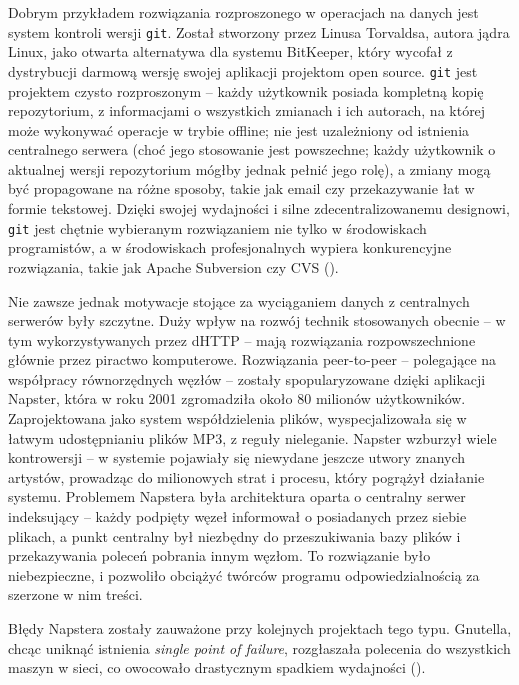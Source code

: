 Dobrym przykładem rozwiązania rozproszonego w operacjach na danych jest system kontroli wersji \texttt{git}.
Został stworzony przez Linusa Torvaldsa, autora jądra Linux, jako otwarta alternatywa dla systemu BitKeeper, który wycofał z dystrybucji darmową wersję swojej aplikacji projektom open source.
\texttt{git} jest projektem czysto rozproszonym -- każdy użytkownik posiada kompletną kopię repozytorium, z informacjami o wszystkich zmianach i ich autorach, na której może wykonywać operacje w trybie offline; nie jest uzależniony od istnienia centralnego serwera (choć jego stosowanie jest powszechne; każdy użytkownik o aktualnej wersji repozytorium mógłby jednak pełnić jego rolę), a zmiany mogą być propagowane na różne sposoby, takie jak email czy przekazywanie łat w formie tekstowej. Dzięki swojej wydajności i silne zdecentralizowanemu designowi, \texttt{git} jest chętnie wybieranym rozwiązaniem nie tylko w środowiskach programistów, a w środowiskach profesjonalnych wypiera konkurencyjne rozwiązania, takie jak Apache Subversion czy CVS (\cite{ram2013git}).

Nie zawsze jednak motywacje stojące za wyciąganiem danych z centralnych serwerów były szczytne. Duży wpływ na rozwój technik stosowanych obecnie -- w tym wykorzystywanych przez dHTTP -- mają rozwiązania rozpowszechnione głównie przez piractwo komputerowe. Rozwiązania peer-to-peer -- polegające na współpracy równorzędnych węzłów -- zostały spopularyzowane dzięki aplikacji Napster, która w roku 2001 zgromadziła około 80 milionów użytkowników. Zaprojektowana jako system współdzielenia plików, wyspecjalizowała się w łatwym udostępnianiu plików MP3, z reguły nieleganie. Napster wzburzył wiele kontrowersji -- w systemie pojawiały się niewydane jeszcze utwory znanych artystów, prowadząc do milionowych strat i procesu, który pogrążył działanie systemu.
Problemem Napstera była architektura oparta o centralny serwer indeksujący -- każdy podpięty węzeł informował o posiadanych przez siebie plikach, a punkt centralny był niezbędny do przeszukiwania bazy plików i przekazywania poleceń pobrania innym węzłom. To rozwiązanie było niebezpieczne, i pozwoliło obciążyć twórców programu odpowiedzialnością za szerzone w nim treści.

Błędy Napstera zostały zauważone przy kolejnych projektach tego typu. Gnutella, chcąc uniknąć istnienia {\em single point of failure}, rozgłaszała polecenia do wszystkich maszyn w sieci, co owocowało drastycznym spadkiem wydajności (\cite{measuringNapsterGnutella}).

